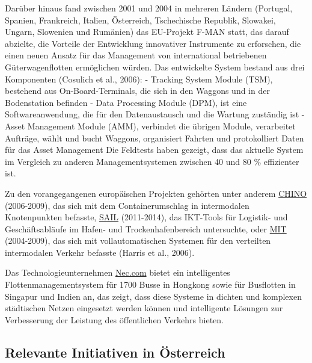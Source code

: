 \documentclass[
]{book}
\begin{document}
Darüber hinaus fand zwischen 2001 und 2004 in mehreren Ländern (Portugal, Spanien, Frankreich, Italien, Österreich, Tschechische Republik, Slowakei, Ungarn, Slowenien und Rumänien) das EU-Projekt F-MAN statt, das darauf abzielte, die Vorteile der Entwicklung innovativer Instrumente zu erforschen, die einen neuen Ansatz für das Management von international betriebenen Güterwagenflotten ermöglichen würden. Das entwickelte System bestand aus drei Komponenten (Cosulich et al., 2006):
- Tracking System Module (TSM), bestehend aus On-Board-Terminals, die sich in den Waggons und in der Bodenstation befinden
- Data Processing Module (DPM), ist eine Softwareanwendung, die für den Datenaustausch und die Wartung zuständig ist
- Asset Management Module (AMM), verbindet die übrigen Module, verarbeitet Aufträge, wählt und bucht Waggons, organisiert Fahrten und protokolliert Daten für das Asset Management
Die Feldtests haben gezeigt, dass das aktuelle System im Vergleich zu anderen Managementsystemen zwischen 40 und 80 \% effizienter ist.

Zu den vorangegangenen europäischen Projekten gehörten unter anderem \href{https://ec.europa.eu/research/participants/documents/downloadPublic?documentIds=080166e5a7b1dc79\&appId=PPGMS}{CHINO} (2006-2009), das sich mit dem Containerumschlag in intermodalen Knotenpunkten befasste, \href{https://cordis.europa.eu/project/id/251589/reporting}{SAIL} (2011-2014), das IKT-Tools für Logistik- und Geschäftsabläufe im Hafen- und Trockenhafenbereich untersuchte, oder \href{http://www.mitproject.eu/}{MIT} (2004-2009), das sich mit vollautomatischen Systemen für den verteilten intermodalen Verkehr befasste (Harris et al., 2006).

Das Technologieunternehmen \href{https://www.nec.com/en/global/solutions/transportation/task/fms_pis.html}{Nec.com} bietet ein intelligentes Flottenmanagementsystem für 1700 Busse in Hongkong sowie für Busflotten in Singapur und Indien an, das zeigt, dass diese Systeme in dichten und komplexen städtischen Netzen eingesetzt werden können und intelligente Lösungen zur Verbesserung der Leistung des öffentlichen Verkehrs bieten.

\hypertarget{relevante-initiativen-in-uxf6sterreich-16}{%
\subsection*{Relevante Initiativen in Österreich}\label{relevante-initiativen-in-uxf6sterreich-16}}
\end{document}
